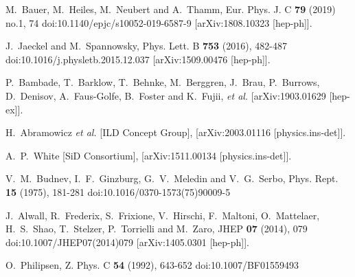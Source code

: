 \begin{thebibliography}{100}
 M.~Bauer, M.~Heiles, M.~Neubert and A.~Thamm,
    Eur. Phys. J. C \textbf{79} (2019) no.1, 74
    doi:10.1140/epjc/s10052-019-6587-9
    [arXiv:1808.10323 [hep-ph]].

 J.~Jaeckel and M.~Spannowsky,
    Phys. Lett. B \textbf{753} (2016), 482-487
    doi:10.1016/j.physletb.2015.12.037
    [arXiv:1509.00476 [hep-ph]].

 P.~Bambade, T.~Barklow, T.~Behnke, M.~Berggren, J.~Brau, P.~Burrows, D.~Denisov, A.~Faus-Golfe, B.~Foster and K.~Fujii, \textit{et al.}
    [arXiv:1903.01629 [hep-ex]].

 H.~Abramowicz \textit{et al.} [ILD Concept Group],
    [arXiv:2003.01116 [physics.ins-det]].

 A.~P.~White [SiD Consortium],
[arXiv:1511.00134 [physics.ins-det]].

 V.~M.~Budnev, I.~F.~Ginzburg, G.~V.~Meledin and V.~G.~Serbo,
    Phys. Rept. \textbf{15} (1975), 181-281
    doi:10.1016/0370-1573(75)90009-5

 J.~Alwall, R.~Frederix, S.~Frixione, V.~Hirschi, F.~Maltoni, O.~Mattelaer, H.~S.~Shao, T.~Stelzer, P.~Torrielli and M.~Zaro,
    JHEP \textbf{07} (2014), 079
    doi:10.1007/JHEP07(2014)079
    [arXiv:1405.0301 [hep-ph]].

 O.~Philipsen,
Z. Phys. C \textbf{54} (1992), 643-652
doi:10.1007/BF01559493


\end{thebibliography}
